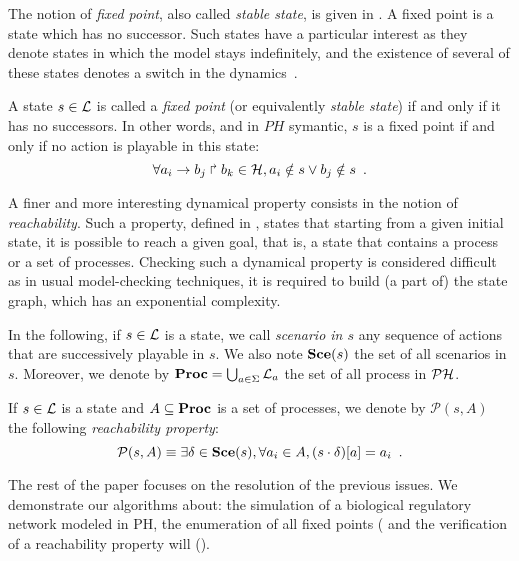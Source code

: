 The notion of \emph{fixed point}, also called \emph{stable state},
is given in .
A fixed point is a state which has no successor.
Such states have a particular interest as they denote states in which the model
stays indefinitely,
and the existence of several of these states denotes a switch in the dynamics~\cite{wuensche1998genomic}.

\begin{definition}
\label{def:fixpoint}
  A state $s \in \mathcal{L}$ is called a \emph{fixed point}
  (or equivalently \emph{stable state})
  if and only if it has no successors.
  In other words, and in $PH$ symantic, $s$ is a fixed point if and only if no action is playable in this state:
  \[\forall a_i\rightarrow b_j\Rsh b_k \in \mathcal{H}, a_i \notin s \vee b_j \notin s \enspace.\]
\end{definition}

A finer and more interesting dynamical property consists in
the notion of \emph{reachability}.
Such a property, defined in ,
states that starting from a given initial state, it is possible
to reach a given goal, that is, a state that contains a process
or a set of processes.
Checking such a dynamical property is considered difficult
as in usual model-checking techniques,
it is required to build (a part of) the state graph,
which has an exponential complexity.

In the following, if $s \in \mathcal{L}$ is a state,
we call \emph{scenario in $s$}
any sequence of actions that are successively playable in $s$.
We also note $\mathbf{Sce}(s)$ the set of all scenarios in $s$.
Moreover, we denote by $\mathbf{Proc} = \bigcup_{a \in \Sigma} \mathcal{L}_a$
the set of all process in $\mathcal{PH}$.

\begin{definition}
\label{def:reachability}
  If $s \in \mathcal{L}$ is a state and $A \subseteq \mathbf{Proc}$ is a set of processes,
  we denote by $\mathcal{P}(s, A)$ the following \emph{reachability property}:
  \[\mathcal{P}(s, A) \equiv \exists \delta \in \mathbf{Sce}(s), \forall a_i \in A, {(s \cdot \delta)[a]} = a_i
    \enspace.\]
\end{definition}

The rest of the paper focuses on the resolution of the previous issues. We demonstrate our algorithms about: the simulation of a biological regulatory network modeled in PH,
the enumeration of all fixed points ( and the verification of a reachability property will ().

